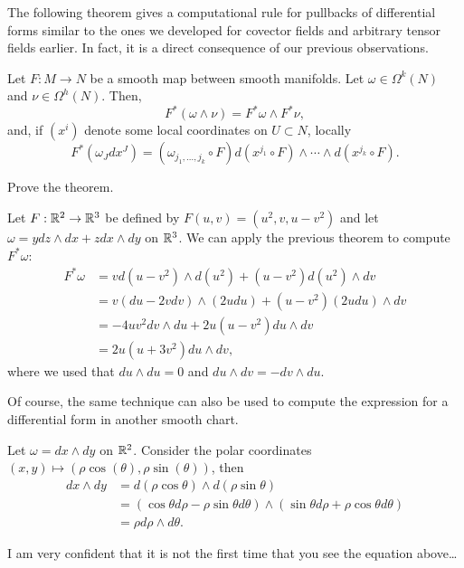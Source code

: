 The following theorem gives a computational rule for pullbacks of differential forms similar to the ones we developed for covector fields and arbitrary tensor fields earlier.
In fact, it is a direct consequence of our previous observations.

\begin{theorem}\label{thm:pullbacksdifferentialforms}
  Let $F: M\to N$ be a smooth map between smooth manifolds.
  Let $\omega\in\Omega^k(N)$ and $\nu\in\Omega^h(N)$.
  Then,
  \begin{equation}
    F^*(\omega\wedge\nu) = F^*\omega \wedge F^*\nu,
  \end{equation}
  and, if $(x^i)$ denote some local coordinates on $U\subset N$, locally
  \begin{equation}
    F^*\left(\omega_J dx^J\right) = (\omega_{j_1,\ldots, j_k}\circ F) d(x^{j_1}\circ F)\wedge\cdots\wedge d(x^{j_k}\circ F).
  \end{equation}
\end{theorem}
\begin{exercise}
  Prove the theorem.
\end{exercise}

\begin{example}
  Let $F:\mathbb{R}^2\to\mathbb{R}^3$ be defined by $F(u,v) = (u^2,v,u-v^2)$ and let $\omega = y dz\wedge dx + z dx\wedge dy$ on $\mathbb{R}^3$.
  We can apply the previous theorem to compute $F^*\omega$:
  \begin{align}
    F^*\omega &= v d(u-v^2)\wedge d(u^2) + (u-v^2) d(u^2)\wedge dv \\
              &= v (du-2vdv)\wedge (2 u du) + (u-v^2) (2u du)\wedge dv\\
              &= -4uv^2 dv\wedge du + 2u(u-v^2) du\wedge dv \\
              &= 2u (u + 3v^2) du \wedge dv,
  \end{align}
  where we used that $du\wedge du =0$ and $du\wedge dv = -dv\wedge du$.
\end{example}

Of course, the same technique can also be used to compute the expression for a differential form in another smooth chart.

\begin{example}
  Let $\omega = dx\wedge dy$ on $\mathbb{R}^2$.
  Consider the polar coordinates $(x,y)\mapsto (\rho\cos(\theta),\rho\sin(\theta))$, then
  \begin{align}
    dx\wedge dy &= d(\rho\cos\theta)\wedge d(\rho\sin\theta) \\
                &= (\cos\theta d\rho -\rho\sin\theta d\theta)\wedge (\sin\theta d\rho + \rho\cos\theta d\theta) \\
                &= \rho d\rho\wedge d\theta.
  \end{align}

  I am very confident that it is not the first time that you see the equation above\ldots
\end{example}

